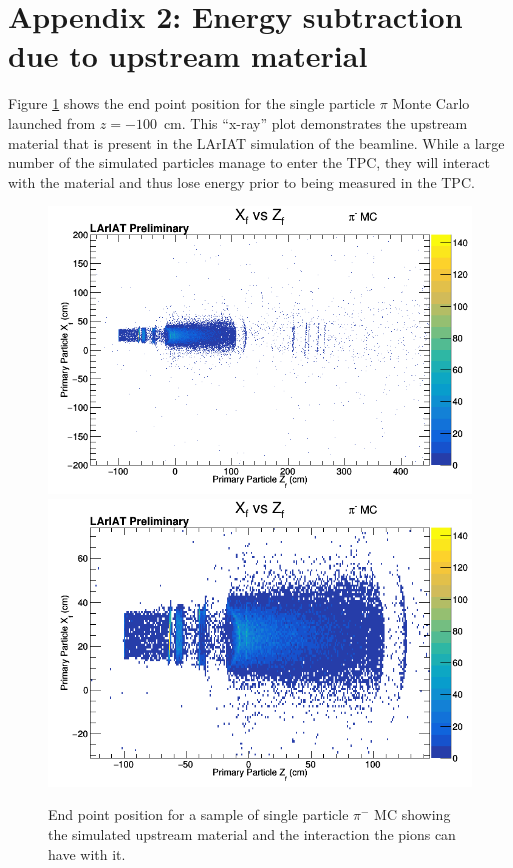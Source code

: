 \section{Appendix 2: Energy subtraction due to upstream material}\label{appendix:EnergyCorrections}

Figure \ref{fig:EndPointPionMCInBeamLine} shows the end point position for the single particle $\pi$ Monte Carlo launched from $z=-100$~cm. This ``x-ray'' plot demonstrates the upstream material that is present in the LArIAT simulation of the beamline. While a large number of the simulated particles manage to enter the TPC, they will interact with the material and thus lose energy prior to being measured in the TPC.

\begin{figure}[h!]
\centering
\includegraphics[scale=0.45]{./images/UnweightedXfvsZf.png}
\includegraphics[scale=0.45]{./images/UnweightedXfvsZfupstreamzoom.png}
\caption{End point position for a sample of single particle $\pi^{-}$ MC showing the simulated upstream material and the interaction the pions can have with it.}
\label{fig:EndPointPionMCInBeamLine}
\end{figure}

